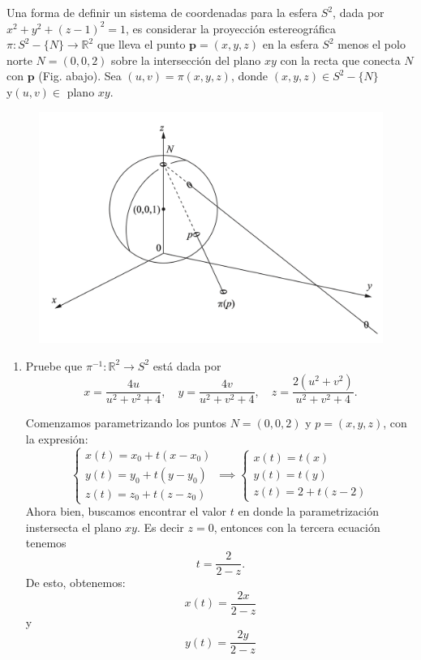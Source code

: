 \begin{problema}
    Una forma de definir un sistema de coordenadas para la esfera $S^2$, dada por $x^2+y^2+(z-1)^2=1$, es considerar la proyección estereográfica $\pi: S^2-\{N\} \rightarrow \mathbb{R}^2$ que lleva el punto $\mathbf{p}=(x, y, z)$ en la esfera $S^2$ menos el polo norte $N=(0,0,2)$ sobre la intersección del plano $x y$ con la recta que conecta $N$ con $\mathbf{p}$ (Fig. abajo). Sea $(u, v)=\pi(x, y, z)$, donde $(x, y, z) \in S^2-\{N\}$ $\mathrm{y}(u, v) \in$ plano $x y$.
    \begin{figure}[H]
        \centering 
        \includegraphics[scale=0.5]{imagenes/4.png}
    \end{figure}

    \begin{enumerate}
        \item Pruebe que $\pi^{-1}: \mathbb{R}^2 \rightarrow S^2$ está dada por
        $$
x=\frac{4 u}{u^2+v^2+4}, \quad y=\frac{4 v}{u^2+v^2+4}, \quad z=\frac{2\left(u^2+v^2\right)}{u^2+v^2+4} .
$$
\begin{sol} Comenzamos parametrizando los puntos $N = (0, 0, 2)$ y $p = (x, y, z)$, con la expresión: $$ \left\{\begin{array}{l} x(t) = x_0 + t(x - x_0) \\ y(t) = y_0 + t(y - y_0) \\ z(t) = z_0 + t(z - z_0) \end{array}\right. \implies \left\{\begin{array}{l} x(t) = t(x) \\ y(t) = t(y ) \\ z(t) = 2 + t(z - 2) \end{array}\right. $$ Ahora bien, buscamos encontrar el valor $t$ en donde la parametrización instersecta el plano $xy$. Es decir $z=0$, entonces con la tercera ecuación tenemos $$t = \frac{2}{2-z}.$$ De esto, obtenemos: 
    $$ x(t)=\frac{2x}{2-z} $$ y $$ y(t)=\frac{2y}{2-z} $$


\end{sol}
\end{enumerate}
\end{problema}
